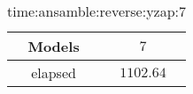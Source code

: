 \begin{table}[!ht]
	\centering
	\begin{tabular}{|c|c|}
		\hline
		Models & $7$ \\ \hline
		elapsed & $1102.64$ \\ \hline
	\end{tabular}
	\caption{time:ansamble:reverse:yzap:7}
	\label{tab:time:ansamble:reverse:yzap:7}
\end{table}
